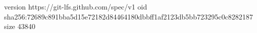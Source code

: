 version https://git-lfs.github.com/spec/v1
oid sha256:72689c891bba5d15e72182d84464180dbbff1af2123db5bb723295c0c8282187
size 43840
